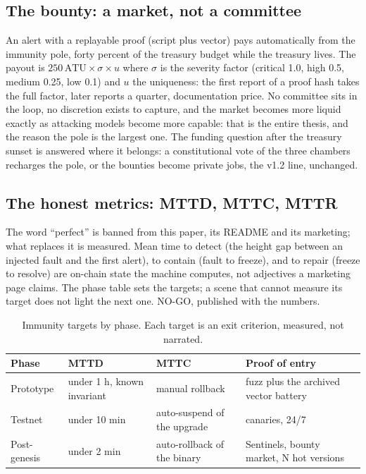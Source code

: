 \subsection{The bounty: a market, not a committee}

An alert with a replayable proof (script plus vector) pays
automatically from the immunity pole, forty percent of the
treasury budget while the treasury lives. The payout is
$250\,\mathrm{ATU} \times \sigma \times u$ where $\sigma$ is the
severity factor (critical 1.0, high 0.5, medium 0.25, low 0.1)
and $u$ the uniqueness: the first report of a proof hash takes
the full factor, later reports a quarter, documentation price.
No committee sits in the loop, no discretion exists to capture,
and the market becomes more liquid exactly as attacking models
become more capable: that is the entire thesis, and the reason
the pole is the largest one. The funding question after the
treasury sunset is answered where it belongs: a constitutional
vote of the three chambers recharges the pole, or the bounties
become private jobs, the v1.2 line, unchanged.

\subsection{The honest metrics: MTTD, MTTC, MTTR}

The word ``perfect'' is banned from this paper, its README and
its marketing; what replaces it is measured. Mean time to detect
(the height gap between an injected fault and the first alert),
to contain (fault to freeze), and to repair (freeze to resolve)
are on-chain state the machine computes, not adjectives a
marketing page claims. The phase table sets the targets; a
scene that cannot measure its target does not light the next
one. NO-GO, published with the numbers.

\begin{table}[htbp]
\centering
\small
\caption{Immunity targets by phase. Each target is an exit
criterion, measured, not narrated.}
\label{tab:mttd}
\begin{tabularx}{\textwidth}{@{}L{3.0cm}L{3.2cm}L{4.2cm}Y@{}}
\toprule
Phase & MTTD & MTTC & Proof of entry \\
\midrule
Prototype & under 1 h, known invariant & manual rollback & fuzz plus the archived vector battery \\
Testnet & under 10 min & auto-suspend of the upgrade & canaries, 24/7 \\
Post-genesis & under 2 min & auto-rollback of the binary & Sentinels, bounty market, N hot versions \\
\bottomrule
\end{tabularx}
\end{table}

